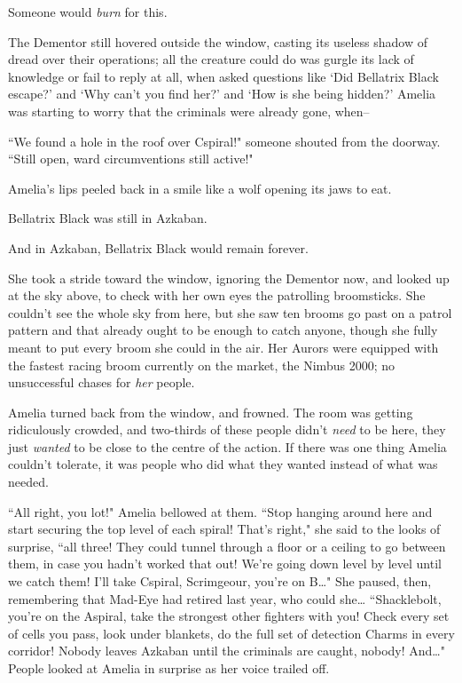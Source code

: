 Someone would \emph{burn} for this.

The Dementor still hovered outside the window, casting its useless shadow of dread over their operations; all the creature could do was gurgle its lack of knowledge or fail to reply at all, when asked questions like `Did Bellatrix Black escape?' and `Why can't you find her?' and `How is she being hidden?' Amelia was starting to worry that the criminals were already gone, when\---

``We found a hole in the roof over C\?spiral!" someone shouted from the doorway. ``Still open, ward circumventions still active!"

Amelia's lips peeled back in a smile like a wolf opening its jaws to eat.

Bellatrix Black was still in Azkaban.

And in Azkaban, Bellatrix Black would remain forever.

She took a stride toward the window, ignoring the Dementor now, and looked up at the sky above, to check with her own eyes the patrolling broomsticks. She couldn't see the whole sky from here, but she saw ten brooms go past on a patrol pattern and that already ought to be enough to catch anyone, though she fully meant to put every broom she could in the air. Her Aurors were equipped with the fastest racing broom currently on the market, the Nimbus 2000; no unsuccessful chases for \emph{her} people.

Amelia turned back from the window, and frowned. The room was getting ridiculously crowded, and two-thirds of these people didn't \emph{need} to be here, they just \emph{wanted} to be close to the centre of the action. If there was one thing Amelia couldn't tolerate, it was people who did what they wanted instead of what was needed.

``All right, you lot!" Amelia bellowed at them. ``Stop hanging around here and start securing the top level of each spiral! That's right," she said to the looks of surprise, ``all three! They could tunnel through a floor or a ceiling to go between them, in case you hadn't worked that out! We're going down level by level until we catch them! I'll take C\?spiral, Scrimgeour, you're on B{\ldots}" She paused, then, remembering that Mad-Eye had retired last year, who could she{\ldots} ``Shacklebolt, you're on the A\?spiral, take the strongest other fighters with you! Check every set of cells you pass, look under blankets, do the full set of detection Charms in every corridor! Nobody leaves Azkaban until the criminals are caught, nobody! And{\ldots}" People looked at Amelia in surprise as her voice trailed off.

